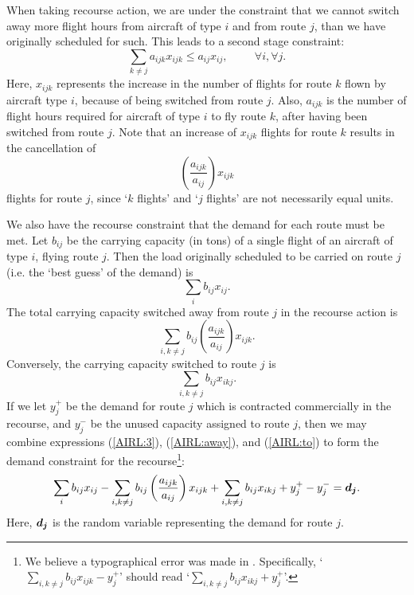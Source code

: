 When taking recourse action, we are under the constraint that we cannot switch away more flight hours from aircraft of type $i$ and from route $j$, than we have originally scheduled for such.  This leads to a second stage constraint:
\begin{equation}
\label{AIRL:2}
\sum_{k \neq j} a_{ijk}x_{ijk} \leq a_{ij}x_{ij} , \hspace{1cm} \forall i, \forall j.
\end{equation}
Here, $x_{ijk}$ represents the increase in the number of flights for route $k$ flown by aircraft type $i$, because of being switched from route $j$.  Also, $a_{ijk}$ is the number of flight hours required for aircraft of type $i$ to fly route $k$, after having been switched from route $j$.  Note that an increase of $x_{ijk}$ flights for route $k$ results in the cancellation of 
\[
\left(\frac{a_{ijk}}{a_{ij}}\right)x_{ijk}
\]
flights for route $j$, since `$k$ flights' and `$j$ flights' are not necessarily equal units.

We also have the recourse constraint that the demand for each route must be met.  Let $b_{ij}$ be the carrying capacity (in tons) of a single flight of an aircraft of type $i$, flying route $j$.  Then the load originally scheduled to be carried on route $j$ (i.e. the `best guess' of the demand) is
\begin{equation}
\label{AIRL:3}
\sum_{i} b_{ij}x_{ij}.
\end{equation}
The total carrying capacity switched away from route $j$ in the recourse action is
\begin{equation}
\label{AIRL:away}
\sum_{i,k\neq j} b_{ij}\left(\frac{a_{ijk}}{a_{ij}}\right)x_{ijk}.
\end{equation}
Conversely, the carrying capacity switched to route $j$ is
\begin{equation}
\label{AIRL:to}
\sum_{i,k\neq j} b_{ij} x_{ikj}.
\end{equation}
If we let $y_j^+$ be the demand for route $j$ which is contracted commercially in the recourse, and $y_j^-$ be the unused capacity assigned to route $j$, then we may combine expressions (\ref{AIRL:3}), (\ref{AIRL:away}), and (\ref{AIRL:to}) to form the demand constraint for the recourse\footnote{We believe a typographical error was made in  \cite[equation (2.3)]{midler69}.  Specifically, `$\displaystyle \sum_{i,k\neq j} b_{ij}x_{ijk} - y_j^+$' should read `$\displaystyle \sum_{i,k\neq j} b_{ij}x_{ikj} + y_j^+$'.}:
\begin{equation}
\label{AIRL:demand}
\sum_{i} b_{ij}x_{ij} - \sum_{i,k\neq j} b_{ij}\left(\frac{a_{ijk}}{a_{ij}}\right)x_{ijk} + \sum_{i,k\neq j} b_{ij} x_{ikj} + y_j^+ - y_j^- = \mathbf{\boldsymbol{d_j}}.
\end{equation}
Here, $\mathbf{\boldsymbol{d_j}}$ is the random variable representing the demand for route $j$.

